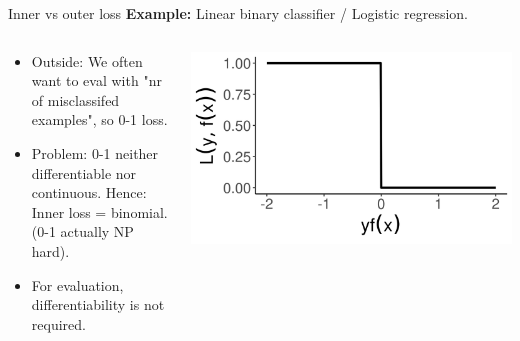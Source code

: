 \documentclass[11pt,compress,t,notes=noshow, xcolor=table]{beamer}
\begin{document}
\begin{vbframe}{Inner vs outer loss}
\textbf{Example:} Linear binary classifier / Logistic regression.
\begin{columns}
\begin{column}{0.7\textwidth}
\small
\begin{itemize}
  \item Outside: We often want to eval with "nr of misclassifed examples",
      so 0-1 loss.
  \item Problem: 0-1 neither differentiable nor continuous.
  Hence: Inner loss = binomial.\\
  (0-1 actually NP hard).
  \item For evaluation, differentiability is not required.
\end{itemize}
\end{column}
\begin{column}{0.3\textwidth}
\begin{center}    
  \includegraphics[width=1.0\textwidth]{figure/plot_loss_01}
\end{center}    
\end{column}
\end{columns}


\end{vbframe}
\end{document}
